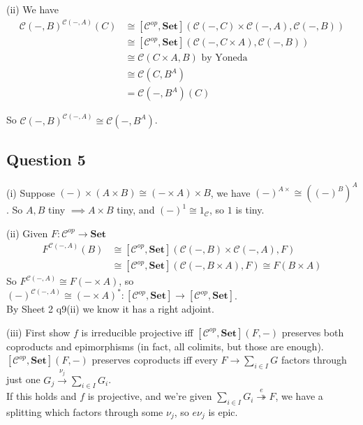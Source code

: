 \documentclass[a4paper]{article}
\begin{document}
(ii) We have 
\begin{equation*}
\begin{aligned}
\mathcal{C}(-,B)^{\mathcal{C}(-,A)} (C) &\cong [\mathcal{C}^{op}, \mathbf{Set}](\mathcal{C}(-,C) \times \mathcal{C}(-,A),\mathcal{C}(-,B))\\
&\cong [\mathcal{C}^{op},\mathbf{Set}](\mathcal{C}(-,C \times A),\mathcal{C}(-,B))\\
&\cong \mathcal{C}(C \times A,B) \text{ by Yoneda}\\
&\cong \mathcal{C}(C,B^A)\\
&=\mathcal{C}(-,B^A)(C)
\end{aligned}
\end{equation*}

So $\mathcal{C}(-,B)^{\mathcal{C}(-,A)} \cong \mathcal{C}(-,B^A)$.

\subsection{Question 5}
(i) Suppose $(-) \times (A \times B) \cong (- \times A) \times B$, we have $(-)^{A \times} \cong ((-)^B)^A$. So $A,B$ tiny $\implies A \times B$ tiny, and $(-)^1 \cong 1_\mathcal{C}$, so $1$ is tiny.

(ii) Given $F:\mathcal{C}^{op} \to \mathbf{Set}$
\begin{equation*}
\begin{aligned}
F^{\mathcal{C}(-,A)}(B) &\cong [\mathcal{C}^{op},\mathbf{Set}](\mathcal{C}(-,B) \times \mathcal{C}(-,A),F)\\
&\cong [\mathcal{C}^{op},\mathbf{Set}](\mathcal{C}(-,B \times A), F) \cong F(B \times A)
\end{aligned}
\end{equation*}
So $F^{\mathcal{C}(-,A)} \cong F(- \times A)$, so $(-)^{\mathcal{C}(-,A)} \cong (- \times A)^*: [\mathcal{C}^{op},\mathbf{Set}] \to [\mathcal{C}^{op},\mathbf{Set}]$.\\
By Sheet 2 q9(ii) we know it has a right adjoint.

(iii) First show $f$ is irreducible projective iff $[\mathcal{C}^{op},\mathbf{Set}](F,-)$ preserves both coproducts and epimorphisms (in fact, all colimits, but those are enough).\\
$[\mathcal{C}^{op},\mathbf{Set}](F,-)$ preserves coproducts iff every $F \to \sum_{i \in I} G$ factors through just one $G_j \xrightarrow{\nu_j} \sum_{i \in I} G_i$.\\
If this holds and $f$ is projective, and we're given $\sum_{i \in I} G_i \stackrel{e}{\twoheadrightarrow} F$, we have a splitting which factors through some $\nu_j$, so $e\nu_j$ is epic.
\end{document}
